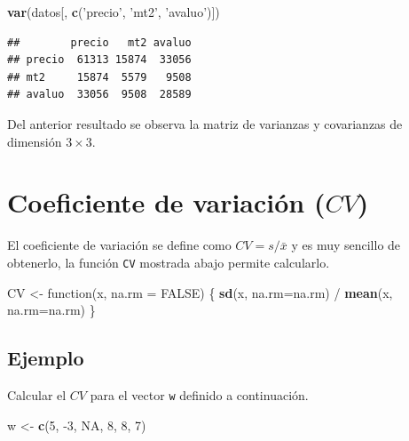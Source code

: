 \documentclass[10pt,]{krantz}
\makeatletter
\newenvironment{Shaded}{\begin{snugshade}}{\end{snugshade}}
\newcommand{\KeywordTok}[1]{\textcolor[rgb]{0.13,0.29,0.53}{\textbf{{#1}}}}
\newcommand{\DataTypeTok}[1]{\textcolor[rgb]{0.13,0.29,0.53}{{#1}}}
\newcommand{\DecValTok}[1]{\textcolor[rgb]{0.00,0.00,0.81}{{#1}}}
\newcommand{\StringTok}[1]{\textcolor[rgb]{0.31,0.60,0.02}{{#1}}}
\newcommand{\OtherTok}[1]{\textcolor[rgb]{0.56,0.35,0.01}{{#1}}}
\newcommand{\NormalTok}[1]{{#1}}
\newenvironment{kframe}{%
\medskip{}
\setlength{\fboxsep}{.8em}
 \def\at@end@of@kframe{}%
 \ifinner\ifhmode%
  \def\at@end@of@kframe{\end{minipage}}%
  \begin{minipage}{\columnwidth}%
 \fi\fi%
 \def\FrameCommand##1{\hskip\@totalleftmargin \hskip-\fboxsep
 \colorbox{shadecolor}{##1}\hskip-\fboxsep
     \hskip-\linewidth \hskip-\@totalleftmargin \hskip\columnwidth}%
 \MakeFramed {\advance\hsize-\width
   \@totalleftmargin\z@ \linewidth\hsize
   \@setminipage}}%
 {\par\unskip\endMakeFramed%
 \at@end@of@kframe}
\renewenvironment{Shaded}{\begin{kframe}}{\end{kframe}}
\makeatother
\begin{document}
\begin{Shaded}
\begin{Highlighting}[]
\KeywordTok{var}\NormalTok{(datos[, }\KeywordTok{c}\NormalTok{(}\StringTok{'precio'}\NormalTok{, }\StringTok{'mt2'}\NormalTok{, }\StringTok{'avaluo'}\NormalTok{)])}
\end{Highlighting}
\end{Shaded}

\begin{verbatim}
##        precio   mt2 avaluo
## precio  61313 15874  33056
## mt2     15874  5579   9508
## avaluo  33056  9508  28589
\end{verbatim}

Del anterior resultado se observa la matriz de varianzas y covarianzas
de dimensión \(3 \times 3\).

\section{\texorpdfstring{Coeficiente de variación (\(CV\))
}{Coeficiente de variación (CV) }}\label{coeficiente-de-variacion-cv}

El coeficiente de variación se define como \(CV=s/\bar{x}\) y es muy
sencillo de obtenerlo, la función \texttt{CV} mostrada abajo permite
calcularlo.

\begin{Shaded}
\begin{Highlighting}[]
\NormalTok{CV <-}\StringTok{ }\NormalTok{function(x, }\DataTypeTok{na.rm =} \OtherTok{FALSE}\NormalTok{) \{}
  \KeywordTok{sd}\NormalTok{(x, }\DataTypeTok{na.rm=}\NormalTok{na.rm) /}\StringTok{ }\KeywordTok{mean}\NormalTok{(x, }\DataTypeTok{na.rm=}\NormalTok{na.rm)}
\NormalTok{\}}
\end{Highlighting}
\end{Shaded}

\subsection*{Ejemplo}\label{ejemplo-41}


Calcular el \(CV\) para el vector \texttt{w} definido a continuación.

\begin{Shaded}
\begin{Highlighting}[]
\NormalTok{w <-}\StringTok{ }\KeywordTok{c}\NormalTok{(}\DecValTok{5}\NormalTok{, -}\DecValTok{3}\NormalTok{, }\OtherTok{NA}\NormalTok{, }\DecValTok{8}\NormalTok{, }\DecValTok{8}\NormalTok{, }\DecValTok{7}\NormalTok{)}
\end{Highlighting}
\end{Shaded}
\end{document}
